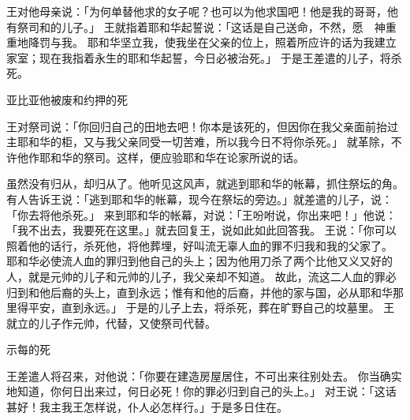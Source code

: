{王对他母亲说：「为何单替他求{}的女子{}呢？也可以为他求国吧！他是我的哥哥，他有祭司{}和{}的儿子{}{}。」
王就指着耶和华起誓说：「{}这话是自己送命，不然，愿　神重重地降罚与我。
耶和华坚立我，使我坐在父亲{}的位上，照着所应许的话为我建立家室；现在我指着永生的耶和华起誓，{}今日必被治死。」
于是{}王差遣{}的儿子{}，将{}杀死。
\par }{\SH 亚比亚他被废和约押的死
\par }{\PP {}王对祭司{}说：「你回{}归自己的田地去吧！你本是该死的，但因你在我父亲{}面前抬过主耶和华的{}柜，又与我父亲同受一切苦难，所以我今日不将你杀死。」
就革除{}，不许他作耶和华的祭司。这样，便应验耶和华在{}论{}家所说的话。
\par }{\PP {}虽然没有归从{}，却归从了{}。他听见这风声，就逃到耶和华的帐幕，抓住祭坛的角。
有人告诉{}王说：「{}逃到耶和华的帐幕，现今在祭坛的旁边。」{}就差遣{}的儿子{}，说：「你去将他杀死。」
来到耶和华的帐幕，对{}说：「王吩咐说，你出来吧！」他说：「我不出去，我要死在这里。」{}就去回复王，说{}如此如此回答我。
王说：「你可以照着他的话行，杀死他，将他葬埋，好叫{}流无辜人血的罪不归我和我的父家了。
耶和华必使{}流人血的罪归到他自己的头上；因为他用刀杀了两个比他又义又好的人，就是{}元帅{}的儿子{}和{}元帅{}的儿子{}，我父亲{}却不知道。
故此，流这二人血的罪必归到{}和他后裔的头上，直到永远；惟有{}和他的后裔，并他的家与国，必从耶和华那里得平安，直到永远。」
于是{}的儿子{}上去，将{}杀死，葬在旷野{}自己的坟墓里。
王就立{}的儿子{}作元帅，代替{}，又使祭司{}代替{}。
\par }{\SH 示每的死
\par }{\PP {}王差遣人将{}召来，对他说：「你要在{}建造房屋居住，不可出来往别处去。
你当确实地知道，你何日出来过{}，何日必死！你的罪必归到自己的头上。」
对王说：「这话甚好！我主我王怎样说，仆人必怎样行。」于是{}多日住在{}。
}
